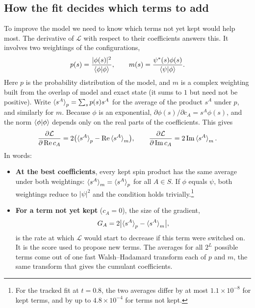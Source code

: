 \documentclass[11pt,a4paper]{article}
\begin{document}
\subsection{How the fit decides which terms to add}
To improve the model we need to know which terms not yet kept would help most. The derivative of $\mathcal{L}$ with respect to their coefficients answers this. It involves two weightings of the configurations,
\[
  p(s)=\frac{|\phi(s)|^2}{\braket{\phi|\phi}},\qquad m(s)=\frac{\psi^*(s)\phi(s)}{\braket{\psi|\phi}} .
\]
Here $p$ is the probability distribution of the model, and $m$ is a complex weighting built from the overlap of model and exact state (it sums to $1$ but need not be positive). Write $\braket{s^A}_p=\sum_sp(s)s^A$ for the average of the product $s^A$ under $p$, and similarly for $m$. Because $\phi$ is an exponential, $\partial\phi(s)/\partial c_A=s^A\phi(s)$, and the norm $\braket{\phi|\phi}$ depends only on the real parts of the coefficients. This gives
\[
  \frac{\partial\mathcal{L}}{\partial\,\mathrm{Re}\,c_A}=2\bigl(\braket{s^A}_p-\mathrm{Re}\braket{s^A}_m\bigr),\qquad
  \frac{\partial\mathcal{L}}{\partial\,\mathrm{Im}\,c_A}=2\,\mathrm{Im}\braket{s^A}_m .
\]
In words:
\begin{itemize}
  \item \textbf{At the best coefficients}, every kept spin product has the same average under both weightings: $\braket{s^A}_m=\braket{s^A}_p$ for all $A\in S$. If $\phi$ equals $\psi$, both weightings reduce to $|\psi|^2$ and the condition holds trivially.\footnote{For the tracked fit at $t=0.8$, the two averages differ by at most $1.1\times10^{-8}$ for kept terms, and by up to $4.8\times10^{-4}$ for terms not kept.}
  \item \textbf{For a term not yet kept} ($c_A=0$), the size of the gradient,
  \[
    G_A=2\bigl|\braket{s^A}_p-\braket{s^A}_m\bigr| ,
  \]
  is the rate at which $\mathcal{L}$ would start to decrease if this term were switched on. It is the score used to propose new terms. The averages for all $2^L$ possible terms come out of one fast Walsh--Hadamard transform each of $p$ and $m$, the same transform that gives the cumulant coefficients.
\end{itemize}
\end{document}
